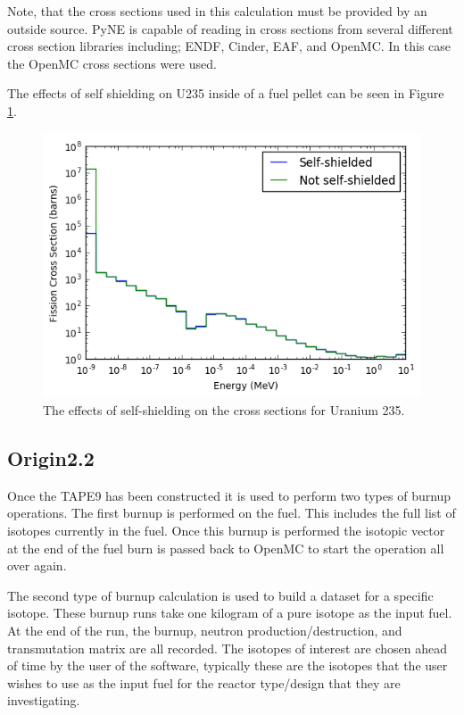 \documentclass{article}
\begin{document}
Note, that the cross sections used in this calculation must be provided by an outside source. PyNE is capable of reading in cross sections from several different cross section libraries including; ENDF, Cinder, EAF, and OpenMC. In this case the OpenMC cross sections were used.  

The effects of self shielding on U235 inside of a fuel pellet can be seen in Figure \ref{fig:index}.
\begin{figure}[h!]
  \center
  \includegraphics[scale=0.8]{index.png}
  \caption{The effects of self-shielding on the cross sections for Uranium 235.}
  \label{fig:index}
\end{figure}

\subsection{Origin2.2}
Once the TAPE9 has been constructed it is used to perform two types of burnup operations. The first burnup is performed on the fuel. This includes the full list of isotopes currently in the fuel. Once this burnup is performed the isotopic vector at the end of the fuel burn is passed back to OpenMC to start the operation all over again.  

The second type of burnup calculation is used to build a dataset for a specific isotope. These burnup runs take one kilogram of a pure isotope as the input fuel. At the end of the run, the burnup, neutron production/destruction, and transmutation matrix are all recorded. The isotopes of interest are chosen ahead of time by the user of the software, typically these are the isotopes that the user wishes to use as the input fuel for the reactor type/design that they are investigating. 
\end{document}
